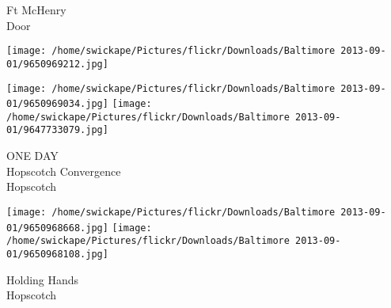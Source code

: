 \documentclass[10pt,letterpaper]{article}
\begin{document}
Ft McHenry\\
Door
\pagebreak

\texttt{[image: /home/swickape/Pictures/flickr/Downloads/Baltimore 2013-09-01/9650969212.jpg]}

\vspace{0.25in}
\texttt{[image: /home/swickape/Pictures/flickr/Downloads/Baltimore 2013-09-01/9650969034.jpg]}
\texttt{[image: /home/swickape/Pictures/flickr/Downloads/Baltimore 2013-09-01/9647733079.jpg]}

ONE DAY\\
Hopscotch Convergence\\
Hopscotch
\pagebreak

\texttt{[image: /home/swickape/Pictures/flickr/Downloads/Baltimore 2013-09-01/9650968668.jpg]}
\texttt{[image: /home/swickape/Pictures/flickr/Downloads/Baltimore 2013-09-01/9650968108.jpg]}

Holding Hands\\
Hopscotch
\pagebreak
\end{document}
